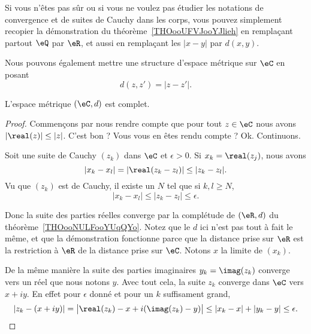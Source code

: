 Si vous n'êtes pas sûr ou si vous ne voulez pas étudier les notations de convergence et de suites de Cauchy dans les corps, vous pouvez simplement recopier la démonstration du théorème~\ref{THOooUFVJooYJlieh} en remplaçant partout \( \eQ\) par \( \eR\), et aussi en remplaçant les \( | x-y |\) par \( d(x,y)\).

\begin{normaltext}
    Nous pouvons également mettre une structure d'espace métrique sur \( \eC\) en posant
    \begin{equation}
        d(z,z')=| z-z' |.
    \end{equation}
\end{normaltext}

\begin{proposition}
    L'espace métrique \( (\eC,d)\) est complet.
\end{proposition}

\begin{proof}
    Commençons par nous rendre compte que pour tout \( z\in \eC\) nous avons \( | \real(z) |\leq | z |\). C'est bon ? Vous vous en êtes rendu compte ? Ok. Continuons.

    Soit une suite de Cauchy \( (z_k)\) dans \( \eC\) et \( \epsilon>0\). Si \( x_k=\real(z_j)\), nous avons
    \begin{equation}
        | x_k-x_l |=| \real(z_k-z_l) |\leq | z_k-z_l |.
    \end{equation}
    Vu que \( (z_k)\) est de Cauchy, il existe un \( N\) tel que si \( k,l\geq N\),
    \begin{equation}
        | x_k-x_l |\leq | z_k-z_l |\leq \epsilon.
    \end{equation}

    Donc la suite des parties réelles converge par la complétude de \( (\eR,d)\) du théorème~\ref{THOooNULFooYUqQYo}. Notez que le \( d\) ici n'est pas tout à fait le même, et que la démonstration fonctionne parce que la distance prise sur \( \eR\) est la restriction à \( \eR\) de la distance prise sur \( \eC\). Notons \( x\) la limite de \( (x_k)\).

    De la même manière la suite des parties imaginaires \( y_k=\imag(z_k)\) converge vers un réel que nous notons \( y\). Avec tout cela, la suite \( z_k\) converge dans \( \eC\) vers \( x+iy\). En effet pour \( \epsilon\) donné et pour un \( k\) suffisament grand,
    \begin{equation}
        | z_k-(x+iy) |=\big| \real(z_k)-x+i(\imag(z_k)-y) \big|\leq | x_k-x |+| y_k-y |\leq \epsilon.
    \end{equation}
\end{proof}

